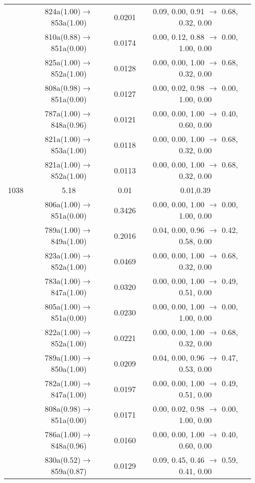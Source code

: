 \documentclass[10pt,a4paper]{article}
\begin{document}
\begin{longtable}{c|c|c|c}
 	& 824a(1.00)$\rightarrow$853a(1.00) &	 0.0201 &	 0.09, 0.00, 0.91 $\rightarrow$ 0.68, 0.32, 0.00 \\ 
 	& 810a(0.88)$\rightarrow$851a(0.00) &	 0.0174 &	 0.00, 0.12, 0.88 $\rightarrow$ 0.00, 1.00, 0.00 \\ 
 	& 825a(1.00)$\rightarrow$852a(1.00) &	 0.0128 &	 0.00, 0.00, 1.00 $\rightarrow$ 0.68, 0.32, 0.00 \\ 
 	& 808a(0.98)$\rightarrow$851a(0.00) &	 0.0127 &	 0.00, 0.02, 0.98 $\rightarrow$ 0.00, 1.00, 0.00 \\ 
 	& 787a(1.00)$\rightarrow$848a(0.96) &	 0.0121 &	 0.00, 0.00, 1.00 $\rightarrow$ 0.40, 0.60, 0.00 \\ 
 	& 821a(1.00)$\rightarrow$853a(1.00) &	 0.0118 &	 0.00, 0.00, 1.00 $\rightarrow$ 0.68, 0.32, 0.00 \\ 
 	& 821a(1.00)$\rightarrow$852a(1.00) &	 0.0113 &	 0.00, 0.00, 1.00 $\rightarrow$ 0.68, 0.32, 0.00 \\ 
 \hline1038 &	 5.18 &	 0.01 &	 0.01,0.39 \\ 
  	& 806a(1.00)$\rightarrow$851a(0.00) &	 0.3426 &	 0.00, 0.00, 1.00 $\rightarrow$ 0.00, 1.00, 0.00 \\ 
 	& 789a(1.00)$\rightarrow$849a(1.00) &	 0.2016 &	 0.04, 0.00, 0.96 $\rightarrow$ 0.42, 0.58, 0.00 \\ 
 	& 823a(1.00)$\rightarrow$852a(1.00) &	 0.0469 &	 0.00, 0.00, 1.00 $\rightarrow$ 0.68, 0.32, 0.00 \\ 
 	& 783a(1.00)$\rightarrow$847a(1.00) &	 0.0320 &	 0.00, 0.00, 1.00 $\rightarrow$ 0.49, 0.51, 0.00 \\ 
 	& 805a(1.00)$\rightarrow$851a(0.00) &	 0.0230 &	 0.00, 0.00, 1.00 $\rightarrow$ 0.00, 1.00, 0.00 \\ 
 	& 822a(1.00)$\rightarrow$852a(1.00) &	 0.0221 &	 0.00, 0.00, 1.00 $\rightarrow$ 0.68, 0.32, 0.00 \\ 
 	& 789a(1.00)$\rightarrow$850a(1.00) &	 0.0209 &	 0.04, 0.00, 0.96 $\rightarrow$ 0.47, 0.53, 0.00 \\ 
 	& 782a(1.00)$\rightarrow$847a(1.00) &	 0.0197 &	 0.00, 0.00, 1.00 $\rightarrow$ 0.49, 0.51, 0.00 \\ 
 	& 808a(0.98)$\rightarrow$851a(0.00) &	 0.0171 &	 0.00, 0.02, 0.98 $\rightarrow$ 0.00, 1.00, 0.00 \\ 
 	& 786a(1.00)$\rightarrow$848a(0.96) &	 0.0160 &	 0.00, 0.00, 1.00 $\rightarrow$ 0.40, 0.60, 0.00 \\ 
 	& 830a(0.52)$\rightarrow$859a(0.87) &	 0.0129 &	 0.09, 0.45, 0.46 $\rightarrow$ 0.59, 0.41, 0.00 \\ 

\end{longtable}
\end{document}
